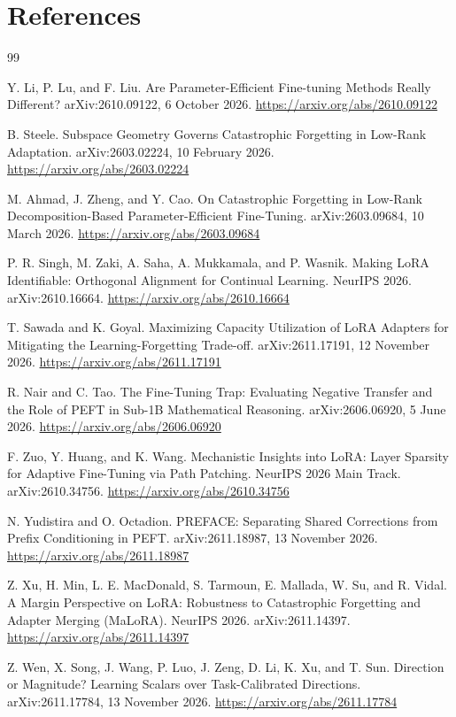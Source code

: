 \documentclass[11pt]{article}
\begin{document}
\section*{References}
\begin{thebibliography}{99}
\small

Y. Li, P. Lu, and F. Liu.
\newblock Are Parameter-Efficient Fine-tuning Methods Really Different?
\newblock arXiv:2610.09122, 6 October 2026.
\newblock \url{https://arxiv.org/abs/2610.09122}

B. Steele.
\newblock Subspace Geometry Governs Catastrophic Forgetting in Low-Rank Adaptation.
\newblock arXiv:2603.02224, 10 February 2026.
\newblock \url{https://arxiv.org/abs/2603.02224}

M. Ahmad, J. Zheng, and Y. Cao.
\newblock On Catastrophic Forgetting in Low-Rank Decomposition-Based Parameter-Efficient Fine-Tuning.
\newblock arXiv:2603.09684, 10 March 2026.
\newblock \url{https://arxiv.org/abs/2603.09684}

P. R. Singh, M. Zaki, A. Saha, A. Mukkamala, and P. Wasnik.
\newblock Making LoRA Identifiable: Orthogonal Alignment for Continual Learning.
\newblock NeurIPS 2026. arXiv:2610.16664.
\newblock \url{https://arxiv.org/abs/2610.16664}

T. Sawada and K. Goyal.
\newblock Maximizing Capacity Utilization of LoRA Adapters for Mitigating the Learning-Forgetting Trade-off.
\newblock arXiv:2611.17191, 12 November 2026.
\newblock \url{https://arxiv.org/abs/2611.17191}

R. Nair and C. Tao.
\newblock The Fine-Tuning Trap: Evaluating Negative Transfer and the Role of PEFT in Sub-1B Mathematical Reasoning.
\newblock arXiv:2606.06920, 5 June 2026.
\newblock \url{https://arxiv.org/abs/2606.06920}

F. Zuo, Y. Huang, and K. Wang.
\newblock Mechanistic Insights into LoRA: Layer Sparsity for Adaptive Fine-Tuning via Path Patching.
\newblock NeurIPS 2026 Main Track. arXiv:2610.34756.
\newblock \url{https://arxiv.org/abs/2610.34756}

N. Yudistira and O. Octadion.
\newblock PREFACE: Separating Shared Corrections from Prefix Conditioning in PEFT.
\newblock arXiv:2611.18987, 13 November 2026.
\newblock \url{https://arxiv.org/abs/2611.18987}

Z. Xu, H. Min, L. E. MacDonald, S. Tarmoun, E. Mallada, W. Su, and R. Vidal.
\newblock A Margin Perspective on LoRA: Robustness to Catastrophic Forgetting and Adapter Merging (MaLoRA).
\newblock NeurIPS 2026. arXiv:2611.14397.
\newblock \url{https://arxiv.org/abs/2611.14397}

Z. Wen, X. Song, J. Wang, P. Luo, J. Zeng, D. Li, K. Xu, and T. Sun.
\newblock Direction or Magnitude? Learning Scalars over Task-Calibrated Directions.
\newblock arXiv:2611.17784, 13 November 2026.
\newblock \url{https://arxiv.org/abs/2611.17784}

\end{thebibliography}
\end{document}
